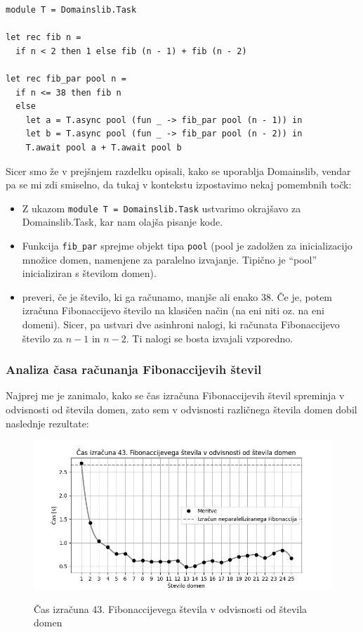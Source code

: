 \documentclass[mat1, tisk]{fmfdelo}
\begin{document}
\begin{lstlisting}
module T = Domainslib.Task

let rec fib n = 
  if n < 2 then 1 else fib (n - 1) + fib (n - 2)

let rec fib_par pool n =
  if n <= 38 then fib n
  else
    let a = T.async pool (fun _ -> fib_par pool (n - 1)) in
    let b = T.async pool (fun _ -> fib_par pool (n - 2)) in
    T.await pool a + T.await pool b
\end{lstlisting}

Sicer smo že v prejšnjem razdelku opisali, kako se uporablja Domainslib, vendar pa se mi zdi smiselno, da tukaj
v kontekstu izpostavimo nekaj pomembnih točk:
\begin{itemize}
  \item Z ukazom \texttt{module T = Domainslib.Task} ustvarimo okrajšavo za Domainslib.Task, kar nam olajša pisanje kode.
  \item Funkcija \texttt{fib\_par} sprejme objekt tipa \texttt{pool} (pool je zadolžen za inicializacijo množice domen, namenjene za 
  paralelno izvajanje. Tipično je ``pool'' inicializiran s številom domen).
  \item preveri, če je število, ki ga računamo, manjše ali enako 38. 
        Če je, potem izračuna Fibonaccijevo število na klasičen način (na eni niti oz. na eni domeni).
        Sicer, pa ustvari dve asinhroni nalogi, ki računata Fibonaccijevo število za $n-1$ in $n-2$. 
        Ti nalogi se bosta izvajali vzporedno.
\end{itemize}

\subsubsection{Analiza časa računanja Fibonaccijevih števil}

Najprej me je zanimalo, kako se čas izračuna Fibonaccijevih števil spreminja v odvisnosti od števila domen, zato sem
v odvisnosti različnega števila domen dobil naslednje rezultate:

\begin{figure}[h!]
  \centering
  \caption{Čas izračuna 43. Fibonaccijevega števila v odvisnosti od števila domen}
  \includegraphics[width=13cm]{slike/fib_par_v_odvisnosti_od_domen.jpg}
  \label{fig:fib_par_v_odvisnosti_od_domen}
\end{figure}
\end{document}
